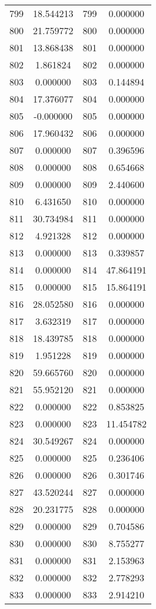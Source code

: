 \documentclass[12pt]{article}
\begin{document}
\begin{longtable}{@{}cccc@{}}
799 & 18.544213 & 799 & 0.000000 \\
800 & 21.759772 & 800 & 0.000000 \\
801 & 13.868438 & 801 & 0.000000 \\
802 & 1.861824 & 802 & 0.000000 \\
803 & 0.000000 & 803 & 0.144894 \\
804 & 17.376077 & 804 & 0.000000 \\
805 & -0.000000 & 805 & 0.000000 \\
806 & 17.960432 & 806 & 0.000000 \\
807 & 0.000000 & 807 & 0.396596 \\
808 & 0.000000 & 808 & 0.654668 \\
809 & 0.000000 & 809 & 2.440600 \\
810 & 6.431650 & 810 & 0.000000 \\
811 & 30.734984 & 811 & 0.000000 \\
812 & 4.921328 & 812 & 0.000000 \\
813 & 0.000000 & 813 & 0.339857 \\
814 & 0.000000 & 814 & 47.864191 \\
815 & 0.000000 & 815 & 15.864191 \\
816 & 28.052580 & 816 & 0.000000 \\
817 & 3.632319 & 817 & 0.000000 \\
818 & 18.439785 & 818 & 0.000000 \\
819 & 1.951228 & 819 & 0.000000 \\
820 & 59.665760 & 820 & 0.000000 \\
821 & 55.952120 & 821 & 0.000000 \\
822 & 0.000000 & 822 & 0.853825 \\
823 & 0.000000 & 823 & 11.454782 \\
824 & 30.549267 & 824 & 0.000000 \\
825 & 0.000000 & 825 & 0.236406 \\
826 & 0.000000 & 826 & 0.301746 \\
827 & 43.520244 & 827 & 0.000000 \\
828 & 20.231775 & 828 & 0.000000 \\
829 & 0.000000 & 829 & 0.704586 \\
830 & 0.000000 & 830 & 8.755277 \\
831 & 0.000000 & 831 & 2.153963 \\
832 & 0.000000 & 832 & 2.778293 \\
833 & 0.000000 & 833 & 2.914210 \\

\end{longtable}
\end{document}
